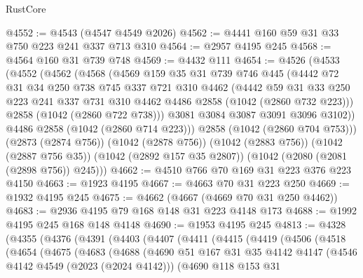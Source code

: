 \begin{lexlean}{RustCore}
\begin{coremodule}
@4552 := @4543 (@4547 @4549 @2026)
@4562 := @4441 @160 @59 @31 @33 @750 @223 @241 @337 @713 @310
@4564 := @2957 @4195 @245
@4568 := @4564 @160 @31 @739 @748
@4569 := @4432 @111
@4654 := @4526
    (@4533
      (@4552
        (@4562
          (@4568
            (@4569
              @159
              @35
              @31
              @739
              @746
              @445
              (@4442
                @72
                @31
                @34
                @250
                @738
                @745
                @337
                @721
                @310
                @4462
                (@4442
                  @59
                  @31
                  @33
                  @250
                  @223
                  @241
                  @337
                  @731
                  @310
                  @4462
                  @4486
                  @2858
                  (@1042 (@2860 @732 @223)))
                @2858
                (@1042 (@2860 @722 @738)))
              @3081
              @3084
              @3087
              @3091
              @3096
              @3102))
          @4486
          @2858
          (@1042 (@2860 @714 @223)))
        @2858
        (@1042 (@2860 @704 @753)))
      (@2873 (@2874 @756))
      (@1042 (@2878 @756))
      (@1042 (@2883 @756))
      (@1042 (@2887 @756 @35))
      (@1042 (@2892 @157 @35 @2807))
      (@1042 (@2080 (@2081 (@2898 @756)) @245)))
@4662 := @4510 @766 @70 @169 @31 @223 @376 @223 @4150
@4663 := @1923 @4195
@4667 := @4663 @70 @31 @223 @250
@4669 := @1932 @4195 @245
@4675 := @4662 (@4667 (@4669 @70 @31 @250 @4462))
@4683 := @2936 @4195 @79 @168 @148 @31 @223 @4148 @173
@4688 := @1992 @4195 @245 @168 @148 @4148
@4690 := @1953 @4195 @245
@4813 := @4328
    (@4355
      (@4376
        (@4391
          (@4403
            (@4407
              (@4411
                (@4415
                  (@4419
                    (@4506
                      (@4518
                        (@4654
                          (@4675
                            (@4683
                              (@4688
                                (@4690
                                  @51
                                  @167
                                  @31
                                  @35
                                  @4142
                                  @4147
                                  (@4546 @4142 @4549 (@2023 (@2024 @4142)))
                                  (@4690
                                    @118
                                    @153
                                    @31

\end{coremodule}
\end{lexlean}
